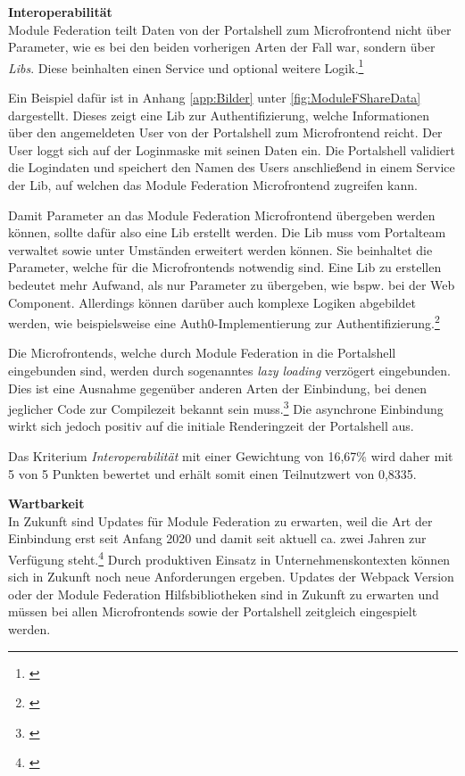\textbf{Interoperabilität}\\
Module Federation teilt Daten von der Portalshell zum Microfrontend nicht über Parameter, wie es bei den beiden vorherigen Arten der Fall war, sondern über \textit{\gls{Lib}s}. Diese beinhalten einen Service und optional weitere Logik.\footnote{\cite[vgl.][63]{Steyer2020}} 

Ein Beispiel dafür ist in Anhang \ref{app:Bilder} unter \cref{fig:ModuleFShareData} dargestellt. Dieses zeigt eine \gls{Lib} zur Authentifizierung, welche Informationen über den angemeldeten User von der Portalshell zum Microfrontend reicht. Der User loggt sich auf der Loginmaske mit seinen Daten ein. Die Portalshell validiert die Logindaten und speichert den Namen des Users anschließend in einem Service der \gls{Lib}, auf welchen das Module Federation Microfrontend zugreifen kann.

Damit Parameter an das Module Federation Microfrontend übergeben werden können, sollte dafür also eine Lib erstellt werden. Die Lib muss vom Portalteam verwaltet sowie unter Umständen erweitert werden können. Sie beinhaltet die Parameter, welche für die Microfrontends notwendig sind. Eine Lib zu erstellen bedeutet mehr Aufwand, als nur Parameter zu übergeben, wie bspw. bei der Web Component. Allerdings können darüber auch komplexe Logiken abgebildet werden, wie beispielsweise eine Auth0-Implementierung zur Authentifizierung.\footnote{\cite[vgl.][]{Steyer2022a}}

Die Microfrontends, welche durch Module Federation in die Portalshell eingebunden sind, werden durch sogenanntes \textit{lazy loading} verzögert eingebunden. Dies ist eine Ausnahme gegenüber anderen Arten der Einbindung, bei denen jeglicher Code zur Compilezeit bekannt sein muss.\footnote{\cite[vgl.][]{Steyer2021c}} Die asynchrone Einbindung wirkt sich jedoch positiv auf die initiale Renderingzeit der Portalshell aus.

Das Kriterium \textit{Interoperabilität} mit einer Gewichtung von 16,67\% wird daher mit 5 von 5 Punkten bewertet und erhält somit einen Teilnutzwert von 0,8335.

\textbf{Wartbarkeit}\\
In Zukunft sind Updates für Module Federation zu erwarten, weil die Art der Einbindung erst seit Anfang 2020 und damit seit aktuell ca. zwei Jahren zur Verfügung steht.\footnote{\cite[vgl.][]{Jackson2020b}} Durch produktiven Einsatz in Unternehmenskontexten können sich in Zukunft noch neue Anforderungen ergeben. Updates der Webpack Version oder der Module Federation Hilfsbibliotheken sind in Zukunft zu erwarten und müssen bei allen Microfrontends sowie der Portalshell zeitgleich eingespielt werden.

